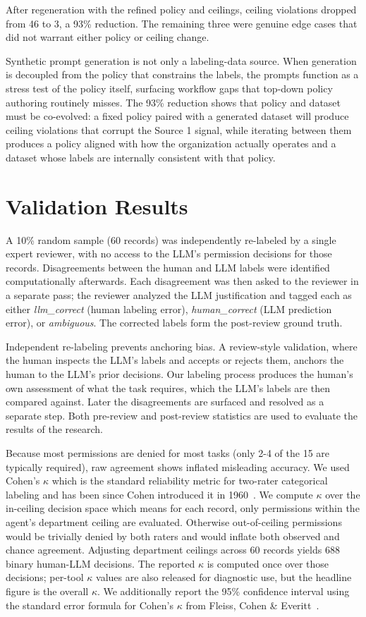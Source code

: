 \documentclass{article}
\theoremstyle{plain}
\theoremstyle{definition}
\theoremstyle{remark}
\begin{document}
After regeneration with the refined policy and ceilings, ceiling 
violations dropped from 46 to 3, a 93\% reduction. The remaining three 
were genuine edge cases that did not warrant either policy or ceiling 
change.

Synthetic prompt generation is not only 
a labeling-data source. When generation is decoupled from the policy 
that constrains the labels, the prompts function as a stress test of the 
policy itself, surfacing workflow gaps that top-down policy authoring 
routinely misses. The 93\% reduction shows that policy and dataset must 
be co-evolved: a fixed policy paired with a generated dataset will 
produce ceiling violations that corrupt the Source 1 signal, while 
iterating between them produces a policy aligned with how the 
organization actually operates and a dataset whose labels are 
internally consistent with that policy.

\section{Validation Results}
A 10\% random sample (60 records) was independently re-labeled by a 
single expert reviewer, with no access to the LLM's permission decisions 
for those records. Disagreements between the human and LLM labels were 
identified computationally afterwards. Each disagreement was then asked 
to the reviewer in a separate pass; the reviewer analyzed the LLM 
justification and tagged each as either \emph{llm\_correct} (human 
labeling error), \emph{human\_correct} (LLM prediction error), or 
\emph{ambiguous}. The corrected labels form the post-review ground truth.

Independent re-labeling prevents anchoring bias. A review-style 
validation, where the human inspects the LLM's labels and accepts or 
rejects them, anchors the human to the LLM's prior decisions. Our labeling process produces the human's own assessment of what the task requires, 
which the LLM's labels are then compared against. Later the disagreements are surfaced and resolved as 
a separate step. Both pre-review and post-review statistics are used to evaluate the results of the research.

Because most permissions are denied for most tasks (only 2-4 of the 15 are typically required), raw agreement shows inflated misleading accuracy. We used Cohen's $\kappa$ which is the standard reliability 
metric for two-rater categorical labeling and has been since Cohen 
introduced it in 1960~\citep{cohen1960coefficient}. We compute $\kappa$ over the in-ceiling decision space which means for 
each record, only permissions within the agent's department ceiling 
are evaluated. Otherwise out-of-ceiling permissions would be trivially 
denied by both raters and would inflate both observed and chance 
agreement. Adjusting department ceilings across 60 records yields 688 
binary human-LLM decisions. The reported $\kappa$ is computed once 
over those decisions; per-tool $\kappa$ values are also released for 
diagnostic use, but the headline figure is the overall $\kappa$. We 
additionally report the 95\% confidence interval using the standard 
error formula for Cohen's $\kappa$ from Fleiss, Cohen \& 
Everitt~\citep{fleiss1969kappa}.
\end{document}
